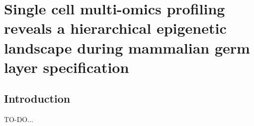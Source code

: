 \chapter{Single cell multi-omics profiling reveals a hierarchical epigenetic landscape during mammalian germ layer specification}

\section{Introduction}
TO-DO...


